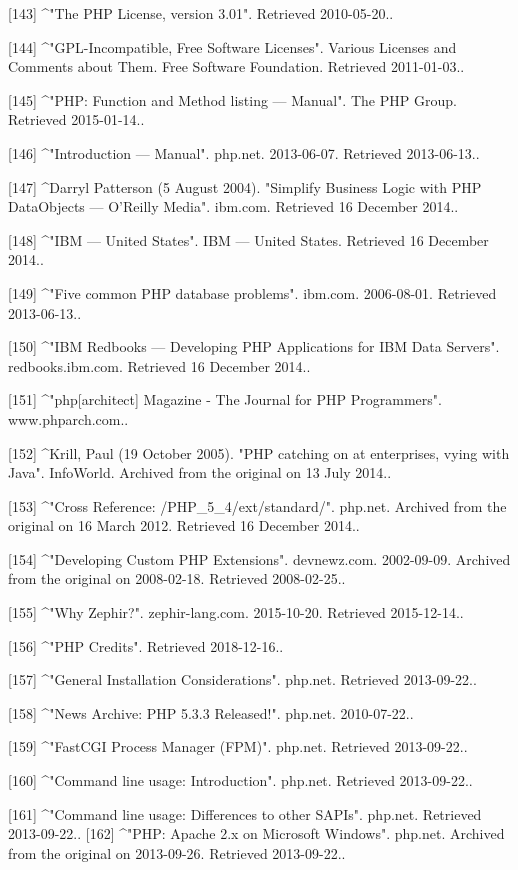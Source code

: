 [143]
^"The PHP License, version 3.01". Retrieved 2010-05-20..

[144]
^"GPL-Incompatible, Free Software Licenses". Various Licenses and Comments about Them. Free Software Foundation. Retrieved 2011-01-03..

[145]
^"PHP: Function and Method listing — Manual". The PHP Group. Retrieved 2015-01-14..

[146]
^"Introduction — Manual". php.net. 2013-06-07. Retrieved 2013-06-13..

[147]
^Darryl Patterson (5 August 2004). "Simplify Business Logic with PHP DataObjects — O'Reilly Media". ibm.com. Retrieved 16 December 2014..

[148]
^"IBM — United States". IBM — United States. Retrieved 16 December 2014..

[149]
^"Five common PHP database problems". ibm.com. 2006-08-01. Retrieved 2013-06-13..

[150]
^"IBM Redbooks — Developing PHP Applications for IBM Data Servers". redbooks.ibm.com. Retrieved 16 December 2014..

[151]
^"php[architect] Magazine - The Journal for PHP Programmers". www.phparch.com..

[152]
^Krill, Paul (19 October 2005). "PHP catching on at enterprises, vying with Java". InfoWorld. Archived from the original on 13 July 2014..

[153]
^"Cross Reference: /PHP_5_4/ext/standard/". php.net. Archived from the original on 16 March 2012. Retrieved 16 December 2014..

[154]
^"Developing Custom PHP Extensions". devnewz.com. 2002-09-09. Archived from the original on 2008-02-18. Retrieved 2008-02-25..

[155]
^"Why Zephir?". zephir-lang.com. 2015-10-20. Retrieved 2015-12-14..

[156]
^"PHP Credits". Retrieved 2018-12-16..

[157]
^"General Installation Considerations". php.net. Retrieved 2013-09-22..

[158]
^"News Archive: PHP 5.3.3 Released!". php.net. 2010-07-22..

[159]
^"FastCGI Process Manager (FPM)". php.net. Retrieved 2013-09-22..

[160]
^"Command line usage: Introduction". php.net. Retrieved 2013-09-22..

[161]
^"Command line usage: Differences to other SAPIs". php.net. Retrieved 2013-09-22..
[162]
^"PHP: Apache 2.x on Microsoft Windows". php.net. Archived from the original on 2013-09-26. Retrieved 2013-09-22..

